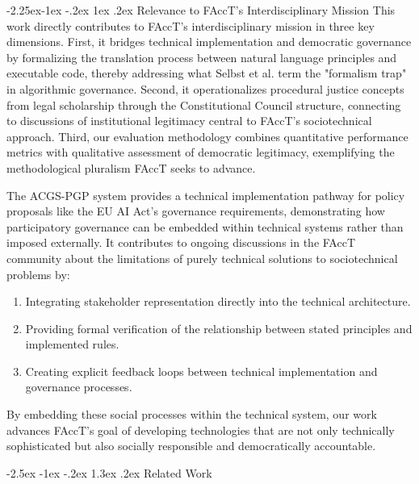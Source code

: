 \documentclass[manuscript,screen,9pt]{acmart}
\makeatletter
\renewcommand\section{\@startsection{section}{1}{\z@}%
  {-2.5ex \@plus -1ex \@minus -.2ex}%
  {1.3ex \@plus.2ex}%
  {\normalfont\Large\bfseries}}
\renewcommand\subsection{\@startsection{subsection}{2}{\z@}%
  {-2.25ex\@plus -1ex \@minus -.2ex}%
  {1ex \@plus .2ex}%
  {\normalfont\large\bfseries}}
\makeatother
\begin{document}
\subsection{Relevance to FAccT's Interdisciplinary Mission}
\label{subsec:facct_relevance}
This work directly contributes to FAccT's interdisciplinary mission in three key dimensions. First, it bridges technical implementation and democratic governance by formalizing the translation process between natural language principles and executable code, thereby addressing what Selbst et al. \cite{Selbst2019FairnessAccountability} term the "formalism trap" in algorithmic governance. Second, it operationalizes procedural justice concepts from legal scholarship through the Constitutional Council structure, connecting to discussions of institutional legitimacy central to FAccT's sociotechnical approach. Third, our evaluation methodology combines quantitative performance metrics with qualitative assessment of democratic legitimacy, exemplifying the methodological pluralism FAccT seeks to advance.

The ACGS-PGP system provides a technical implementation pathway for policy proposals like the EU AI Act's governance requirements, demonstrating how participatory governance can be embedded within technical systems rather than imposed externally. It contributes to ongoing discussions in the FAccT community about the limitations of purely technical solutions to sociotechnical problems by:
\begin{enumerate}[leftmargin=*,itemsep=1pt,parsep=1pt]
    \item Integrating stakeholder representation directly into the technical architecture.
    \item Providing formal verification of the relationship between stated principles and implemented rules.
    \item Creating explicit feedback loops between technical implementation and governance processes.
\end{enumerate}
By embedding these social processes within the technical system, our work advances FAccT's goal of developing technologies that are not only technically sophisticated but also socially responsible and democratically accountable.

\FloatBarrier %
\section{Related Work}
\label{sec:related_work}
\end{document}
